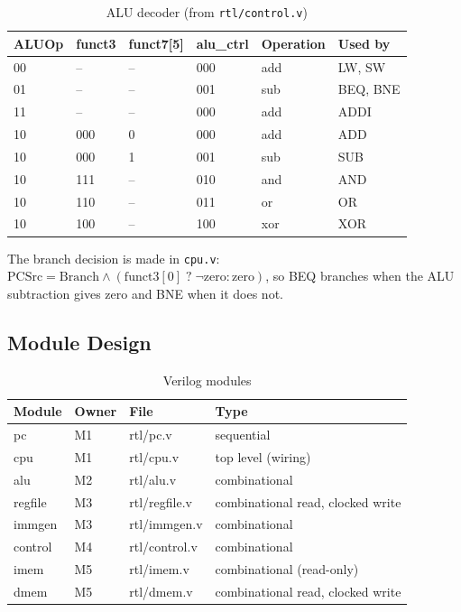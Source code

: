\documentclass[conference]{IEEEtran}
\begin{document}
\begin{table}[h]
\centering\footnotesize\setlength{\tabcolsep}{3pt}
\caption{ALU decoder (from \texttt{rtl/control.v})}
\label{tab:aludec}
\begin{tabular}{llllll}
\toprule
ALUOp & funct3 & funct7[5] & alu\_ctrl & Operation & Used by \\
\midrule
00 & -- & -- & 000 & add & LW, SW \\
01 & -- & -- & 001 & sub & BEQ, BNE \\
11 & -- & -- & 000 & add & ADDI \\
10 & 000 & 0 & 000 & add & ADD \\
10 & 000 & 1 & 001 & sub & SUB \\
10 & 111 & -- & 010 & and & AND \\
10 & 110 & -- & 011 & or  & OR \\
10 & 100 & -- & 100 & xor & XOR \\
\bottomrule
\end{tabular}
\end{table}

The branch decision is made in \texttt{cpu.v}:
$\mathrm{PCSrc} = \mathrm{Branch} \wedge (\mathrm{funct3}[0] \;?\; \neg\mathrm{zero} : \mathrm{zero})$,
so BEQ branches when the ALU subtraction gives zero and BNE when it does not.

\subsection{Module Design}

\begin{table}[h]
\centering\footnotesize\setlength{\tabcolsep}{3pt}
\caption{Verilog modules}
\label{tab:modules}
\begin{tabular}{llll}
\toprule
Module & Owner & File & Type \\
\midrule
pc      & M1 & rtl/pc.v      & sequential \\
cpu     & M1 & rtl/cpu.v     & top level (wiring) \\
alu     & M2 & rtl/alu.v     & combinational \\
regfile & M3 & rtl/regfile.v & combinational read, clocked write \\
immgen  & M3 & rtl/immgen.v  & combinational \\
control & M4 & rtl/control.v & combinational \\
imem    & M5 & rtl/imem.v    & combinational (read-only) \\
dmem    & M5 & rtl/dmem.v    & combinational read, clocked write \\
\bottomrule
\end{tabular}
\end{table}
\end{document}
